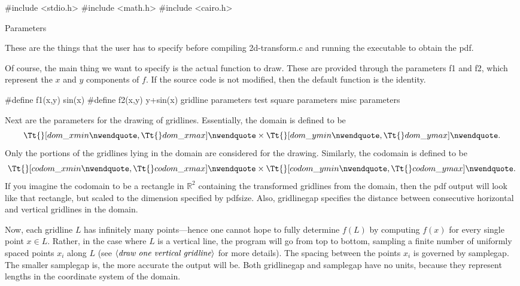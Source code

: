 \documentclass{article}%
\def\R{\mathbb{R}}
\def\refcode#1{$\langle\hbox{\em #1}\rangle$}
\def\heading#1{\noindent\bigbf #1 \rm\par\smallskip}
\begin{document}
\nwenddocs{}\endmoddef\nwstartdeflinemarkup\nwenddeflinemarkup
#include <stdio.h>
#include <math.h>
#include <cairo.h>

\nwendcode{}\heading{Parameters}
These are the things that the user has to specify before compiling {\Tt{}2d-transform.c\nwendquote} and running the executable to obtain the pdf.

Of course, the main thing we want to specify is the actual function to draw. These are provided through the parameters {\Tt{}f1\nwendquote} and {\Tt{}f2\nwendquote}, which represent the $x$ and $y$ components of $f$. If the source code is not modified, then the default function is the identity.

\nwenddocs{}\endmoddef\nwstartdeflinemarkup\nwenddeflinemarkup
#define f1(x,y) sin(x)
#define f2(x,y) y+sin(x)
\LA{}gridline parameters\RA{}
\LA{}test square parameters\RA{}
\LA{}misc parameters\RA{}

\nwendcode{}Next are the parameters for the drawing of gridlines. Essentially, the domain is defined to be $${\Tt{}[dom{\_}xmin\nwendquote}, {\Tt{}dom{\_}xmax]\nwendquote} \times {\Tt{}[dom{\_}ymin\nwendquote},{\Tt{}dom{\_}ymax]\nwendquote}.$$ Only the portions of the gridlines lying in the domain are considered for the drawing. Similarly, the codomain is defined to be $${\Tt{}[codom{\_}xmin\nwendquote},{\Tt{}codom{\_}xmax]\nwendquote} \times {\Tt{}[codom{\_}ymin\nwendquote},{\Tt{}codom{\_}ymax]\nwendquote}.$$ If you imagine the codomain to be a rectangle in $\R^2$ containing the transformed gridlines from the domain, then the pdf output will look like that rectangle, but scaled to the dimension specified by {\Tt{}pdfsize\nwendquote}. Also, {\Tt{}gridlinegap\nwendquote} specifies the distance between consecutive horizontal and vertical gridlines in the domain.

Now, each gridline $L$ has infinitely many points---hence one cannot hope to fully determine $f(L)$ by computing $f(x)$ for every single point $x \in L$. Rather, in the case where $L$ is a vertical line, the program will go from top to bottom, sampling a finite number of uniformly spaced points $x_i$ along $L$ (see \refcode{draw one vertical gridline} for more details). The spacing between the points $x_i$ is governed by {\Tt{}samplegap\nwendquote}. The smaller {\Tt{}samplegap\nwendquote} is, the more accurate the output will be. Both {\Tt{}gridlinegap\nwendquote} and {\Tt{}samplegap\nwendquote} have no units, because they represent lengths in the coordinate system of the domain.
\end{document}
